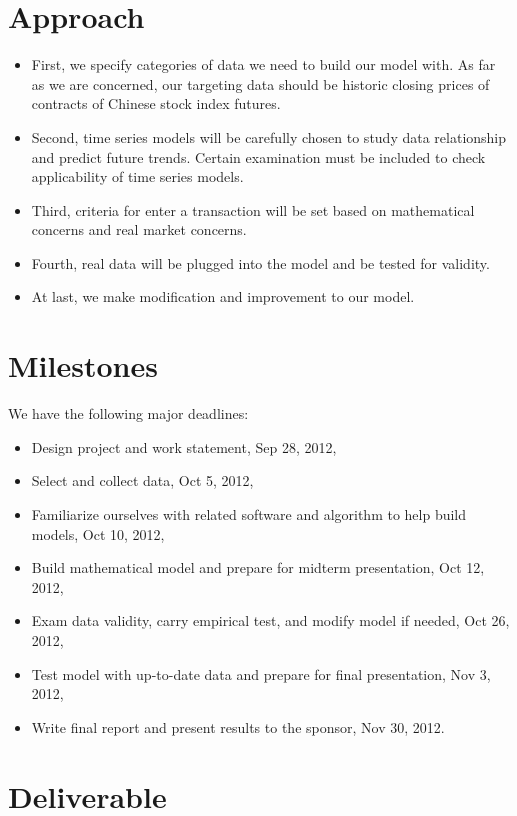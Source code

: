\documentclass[12pt,letterpaper]{article}
\theoremstyle{definition}
\begin{document}
\section{Approach}
\begin{itemize}
    \item 	First, we specify categories of data we need to build our model with. As far as we are concerned, our targeting data should be historic closing prices of contracts of Chinese stock index futures.  
    \item 	Second, time series models will be carefully chosen to study data relationship and predict future trends. Certain examination must be included to check applicability of time series models.
    \item 	Third, criteria for enter a transaction will be set based on mathematical concerns and real market concerns.
    \item       Fourth, real data will be plugged into the model and be tested for validity.
    \item       At last, we make modification and improvement to our model. 
\end{itemize}
\section{Milestones}
We have the following major deadlines:
\begin{itemize}
    \item Design project and work statement, Sep 28, 2012,
    \item Select and collect data, Oct 5, 2012,
    \item Familiarize ourselves with related software and algorithm to help build models, Oct 10, 2012,
    \item Build mathematical model and prepare for midterm presentation, Oct 12, 2012,
    \item Exam data validity, carry empirical test, and modify model if needed, Oct 26, 2012,
    \item Test model with up-to-date data and prepare for final presentation, Nov 3, 2012,
    \item Write final report and present results to the sponsor, Nov 30, 2012.
\end{itemize}

\section{Deliverable}
\end{document}
